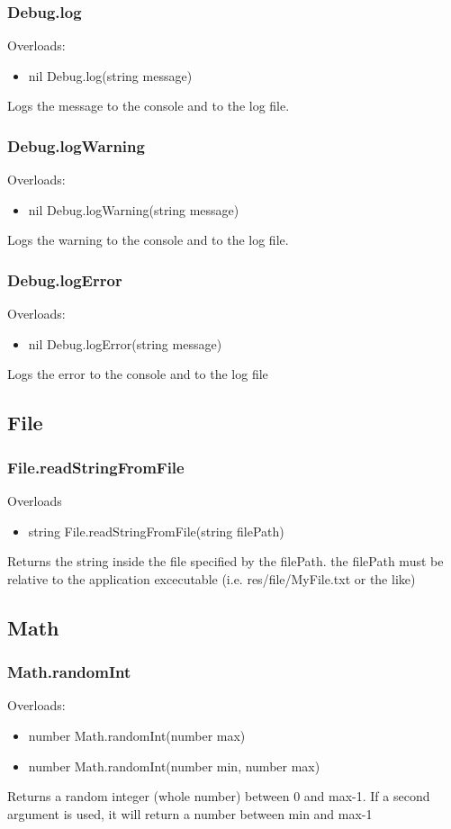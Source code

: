 \documentclass{book}
\newenvironment{ulist}
	{\begin{itemize}
			\itemsep0em}
	{\end{itemize}}
\begin{document}
\subsubsection{Debug.log}
Overloads:
\begin{ulist}
	\item nil Debug.log(string message)
\end{ulist}
Logs the message to the console and to the log file.

\subsubsection{Debug.logWarning}
Overloads:
\begin{ulist}
	\item nil Debug.logWarning(string message)
\end{ulist}
Logs the warning to the console and to the log file.

\subsubsection{Debug.logError}
Overloads:
\begin{ulist}
	\item nil Debug.logError(string message)
\end{ulist}
Logs the error to the console and to the log file


\subsection{File}
\subsubsection{File.readStringFromFile}
Overloads
\begin{ulist}
	\item string File.readStringFromFile(string filePath)
\end{ulist}
Returns the string inside the file specified by the filePath. the filePath must be relative to the application excecutable (i.e. res/file/MyFile.txt or the like)


\subsection{Math}
\subsubsection{Math.randomInt}
Overloads:
\begin{ulist}
	\item number Math.randomInt(number max)
	\item number Math.randomInt(number min, number max)
\end{ulist}
Returns a random integer (whole number) between 0 and max-1.
If a second argument is used, it will return a number between min and max-1
\end{document}
